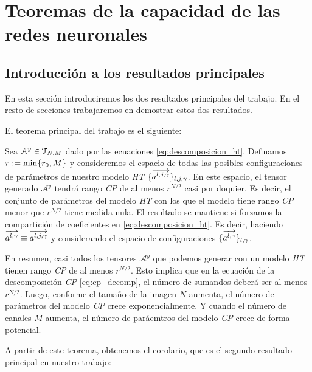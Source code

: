 \chapter{Teoremas de la capacidad de las redes neuronales} \label{chapter:teoremas_y_demostraciones}

\section{Introducción a los resultados principales}

En esta sección introduciremos los dos resultados principales del trabajo. En el resto de secciones trabajaremos en demostrar estos dos resultados.

El teorema principal del trabajo es el siguiente:

\begin{teorema} \label{teorema:teorema_principal_introduccion}

Sea $\mathcal{A}^y \in \mathcal{T}_{N, M}$ dado por las ecuaciones \eqref{eq:descomposicion_ht}. Definamos $r := \min \{ r_0, M \}$ y consideremos el espacio de todas las posibles configuraciones de parámetros de nuestro modelo \textit{HT} $\{  \overrightarrow{a^{l, j, \gamma}} \}_{l, j, \gamma}$. En este espacio, el tensor generado $\mathcal{A}^y$ tendrá rango \textit{CP} de al menos $r^{N/2}$ casi por doquier. Es decir, el conjunto de parámetros del modelo \textit{HT} con los que el modelo tiene rango \textit{CP} menor que $r^{N/2}$ tiene medida nula. El resultado se mantiene si forzamos la compartición de coeficientes en \eqref{eq:descomposicion_ht}. Es decir, haciendo $\overrightarrow{a^{l, \gamma}} \equiv \overrightarrow{a^{l, j, \gamma}}$ y considerando el espacio de configuraciones $\{ \overrightarrow{a^{l, \gamma}}  \}_{l, \gamma}$.

\end{teorema}

En resumen, casi todos los tensores $\mathcal{A}^y$ que podemos generar con un modelo \textit{HT} tienen rango \textit{CP} de al menos $r^{N/2}$. Esto implica que en la ecuación de la descomposición \textit{CP} \eqref{eq:cp_decomp}, el número de sumandos deberá ser al menos $r^{N/2}$. Luego, conforme el tamaño de la imagen $N$ aumenta, el número de parámetros del modelo \textit{CP} crece exponencialmente. Y cuando el número de canales $M$ aumenta, el número de paráemtros del modelo \textit{CP} crece de forma potencial.

A partir de este teorema, obtenemos el corolario, que es el segundo resultado principal en nuestro trabajo:

